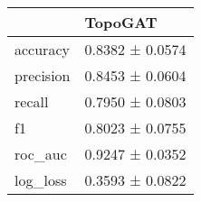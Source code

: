 \begin{tabular}{ll}
\toprule
 & TopoGAT \\
\midrule
accuracy & 0.8382 ± 0.0574 \\
precision & 0.8453 ± 0.0604 \\
recall & 0.7950 ± 0.0803 \\
f1 & 0.8023 ± 0.0755 \\
roc_auc & 0.9247 ± 0.0352 \\
log_loss & 0.3593 ± 0.0822 \\
\bottomrule
\end{tabular}
